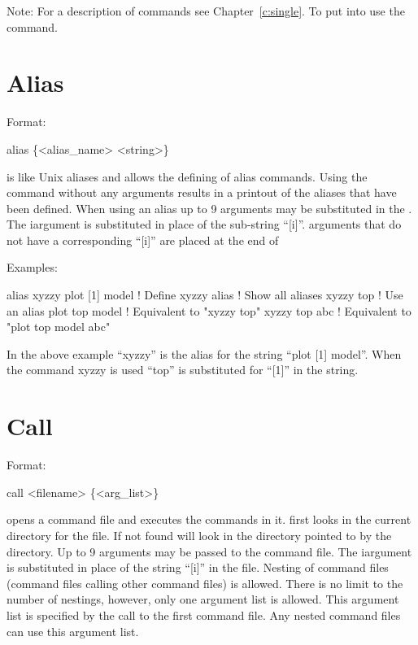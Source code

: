
Note: For a description of  commands see
Chapter~\ref{c:single}. To put \tao into  use the
 command. 

\vfil
\break

\section{Alias}
\label{s:alias}

Format: 
\begin{example}
  alias \{<alias_name> <string>\}
\end{example}

\vskip 0.2in

 is like Unix aliases and allows the defining of alias
commands. Using the  command without any arguments results
in a printout of the aliases that have been defined. When using an
alias up to 9 arguments may be substituted in the . The
i\Th argument is substituted in place of the sub-string ``[i]''.
arguments that do not have a corresponding ``[i]'' are placed at the end
of 

Examples:
\begin{example}
    alias xyzzy plot [1] model  ! Define xyzzy
    alias                       ! Show all aliases
    xyzzy top                   ! Use an alias
    plot top model              ! Equivalent to "xyzzy top"
    xyzzy top abc               ! Equivalent to "plot top model abc"
\end{example}
In the above example ``xyzzy'' is the alias for the string ``plot [1]
model''.  When the command xyzzy is used ``top'' is substituted
for ``[1]'' in the string.

\section{Call}
\label{s:call}

Format: 
\begin{example}
  call <filename> \{<arg_list>\}  \Strut
\end{example}

\vskip 0.2in  opens a command file and executes the commands in it.
\tao first looks in the current directory for the file. If not found \tao will
look in the directory pointed to by the  directory.  Up to 9
arguments may be passed to the command file. The i\Th argument is substituted in
place of the string ``[i]'' in the file. Nesting of command files (command files
calling other command files) is allowed. There is no limit to the number of
nestings, however, only one argument list is allowed. This argument list is
specified by the call to the first command file. Any nested command files can
use this argument list.

